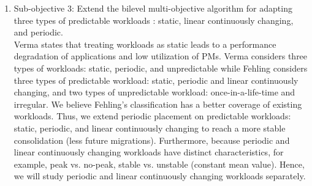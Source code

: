 \begin{enumerate}




	\item Sub-objective 3: Extend the bilevel multi-objective algorithm for adapting three types of predictable workloads \cite{Fehling:2014tl}: static, linear continuously changing, and periodic. \\
	
	 Verma \cite{Verma:2009wi} states that treating workloads as static leads to a performance degradation of applications and low utilization of PMs. Verma considers three types of workloads: static, periodic, and unpredictable while Fehling \cite{Fehling:2014tl} considers three types of predictable workload: static, periodic and linear continuously changing, and two types of unpredictable workload: once-in-a-life-time and irregular. We believe Fehling's classification has a better coverage of existing workloads. Thus, we extend periodic placement on predictable workloads: static, periodic, and linear continuously changing to reach a more stable consolidation (less future migrations). Furthermore, because periodic and linear continuously changing workloads have distinct characteristics, for example, peak vs. no-peak, stable vs. unstable (constant mean value). Hence, we will study periodic and linear continuously changing workloads separately.


\end{enumerate}
